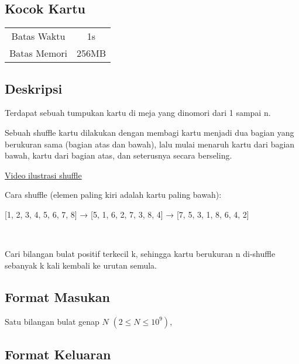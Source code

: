 \documentclass{article}
\begin{document}
\begin{center}

    
    \section*{Kocok Kartu} %

    \begin{tabular}{ | c c | }
        \hline
        Batas Waktu  & 1s \\    %
        Batas Memori & 256MB \\  %
        \hline
    \end{tabular}
\end{center}

\subsection*{Deskripsi}

Terdapat sebuah tumpukan kartu di meja yang dinomori dari 1 sampai n.



Sebuah shuffle kartu dilakukan dengan membagi kartu menjadi dua bagian yang berukuran sama (bagian atas dan bawah), lalu mulai menaruh kartu dari bagian bawah, kartu dari bagian atas, dan seterusnya secara berseling.



\href{https://en.wikipedia.org/wiki/Shuffling#/media/File:Riffle_shuffle.gif}{Video ilustrasi shuffle}


Cara shuffle (elemen paling kiri adalah kartu paling bawah):

[1, 2, 3, 4, 5, 6, 7, 8] → [5, 1, 6, 2, 7, 3, 8, 4] → [7, 5, 3, 1, 8, 6, 4, 2]

\

Cari bilangan bulat positif terkecil k, sehingga kartu berukuran n di-shuffle sebanyak k kali kembali ke urutan semula.

\subsection*{Format Masukan}

Satu bilangan bulat genap $N$ $(2 \leq N \leq 10^{9})$,

\subsection*{Format Keluaran}
\end{document}
